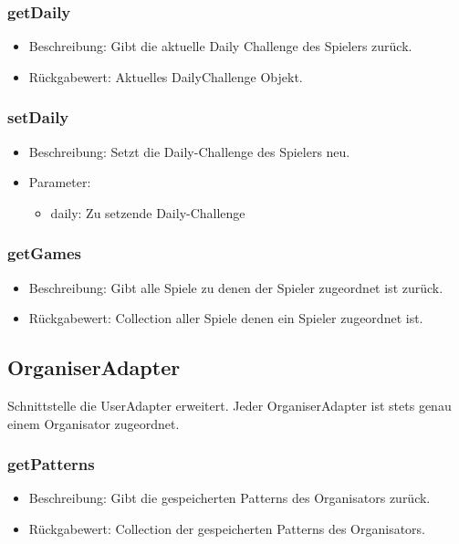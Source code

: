 \documentclass[a4paper]{scrreprt}
\begin{document}
	\subsubsection{getDaily}
	\begin{itemize}
		\item Beschreibung: Gibt die aktuelle Daily Challenge des Spielers zurück.
		\item Rückgabewert: Aktuelles DailyChallenge Objekt.
	\end{itemize}

	\subsubsection{setDaily}
	\begin{itemize}
		\item Beschreibung: Setzt die Daily-Challenge des Spielers neu.
		\item Parameter:
		\begin{itemize}
			\item daily: Zu setzende Daily-Challenge
		\end{itemize}
	\end{itemize}
	\subsubsection{getGames}
	\begin{itemize}
		\item Beschreibung: Gibt alle Spiele zu denen der Spieler zugeordnet ist zurück.
		\item Rückgabewert: Collection aller Spiele denen ein Spieler zugeordnet ist.
	\end{itemize}

	\subsection{OrganiserAdapter}
	Schnittstelle die UserAdapter erweitert.
	Jeder OrganiserAdapter ist stets genau einem Organisator zugeordnet.

	\subsubsection{getPatterns}
	\begin{itemize}
		\item Beschreibung: Gibt die gespeicherten Patterns des Organisators zurück.
		\item Rückgabewert: Collection der gespeicherten Patterns des Organisators.
	\end{itemize}
\end{document}
